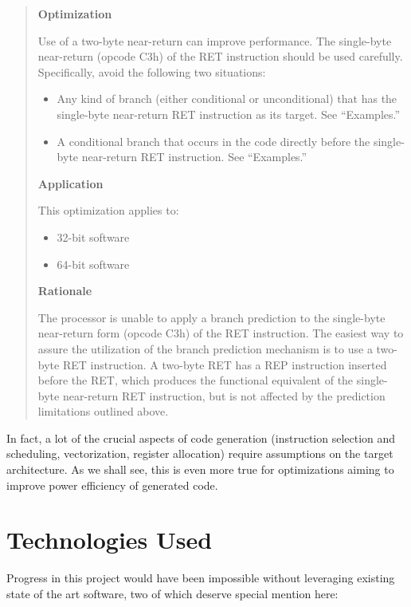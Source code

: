 \begin{quote}

\textbf{Optimization}

Use of a two-byte near-return can improve performance. The single-byte
near-return (opcode C3h) of the RET instruction should be used
carefully. Specifically, avoid the following two situations:

\begin{itemize}
\item Any kind of branch (either conditional or unconditional) that
  has the single-byte near-return RET instruction as its target. See
  ``Examples.''

\item A conditional branch that occurs in the code directly before the
  single-byte near-return RET instruction. See ``Examples.''
\end{itemize}

\textbf{Application}

This optimization applies to:

\begin{itemize}
\item 32-bit software
\item 64-bit software
\end{itemize}

\textbf{Rationale}

The processor is unable to apply a branch prediction to the
single-byte near-return form (opcode C3h) of the RET instruction.  The
easiest way to assure the utilization of the branch prediction
mechanism is to use a two-byte RET instruction. A two-byte RET has a
REP instruction inserted before the RET, which produces the functional
equivalent of the single-byte near-return RET instruction, but is not
affected by the prediction limitations outlined above.

\end{quote}

In fact, a lot of the crucial aspects of code generation (instruction
selection and scheduling, vectorization, register allocation) require
assumptions on the target architecture.  As we shall see, this is even
more true for optimizations aiming to improve power efficiency of
generated code.

\section{Technologies Used}

Progress in this project would have been impossible without leveraging
existing state of the art software, two of which deserve special
mention here:

